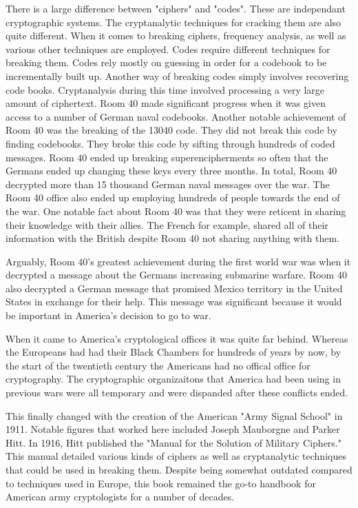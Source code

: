 \documentclass{article}
\begin{document}
    There is a large difference between "ciphers" and "codes". These are independant
    cryptographic systems. The cryptanalytic techniques for cracking them are also
    quite different.
    When it comes to breaking ciphers, frequency analysis, as well as various
    other techniques are employed.
    Codes require different techniques for breaking them. Codes rely mostly
    on guessing in order for a codebook to be incrementally built up.
    Another way of breaking codes simply involves recovering code books.
    Cryptanalysis during this time involved processing a very large amount of
    ciphertext.
    Room 40 made significant progress when it was given access to a number of German
    naval codebooks.
    Another notable achievement of Room 40 was the breaking of the 13040 code.
    They did not break this code by finding codebooks. They broke this code
    by sifting through hundreds of coded messages.
    Room 40 ended up breaking superencipherments so often that the Germans
    ended up changing these keys every three months.
    In total, Room 40 decrypted more than 15 thousand German naval messages
    over the war.
    The Room 40 office also ended up employing hundreds of people towards the
    end of the war.
    One notable fact about Room 40 was that they were reticent in sharing their
    knowledge with their allies. The French for example, shared all of their
    information with the British despite Room 40 not sharing anything with them.

    Arguably, Room 40's greatest achievement during the first world war was when
    it decrypted a message about the Germans increasing submarine warfare.
    Room 40 also decrypted a German message that promised Mexico territory
    in the United States in exchange for their help. This message was significant
    because it would be important in America's decision to go to war.

    When it came to America's cryptological offices it was quite far behind.
    Whereas the Europeans had had their Black Chambers for hundreds of years by now,
    by the start of the twentieth century the Americans had no offical office
    for cryptography. The cryptographic organizaitons that America had been using
    in previous wars were all temporary and were dispanded after these conflicts ended.

    This finally changed with the creation of the American "Army Signal School" in 1911.
    Notable figures that worked here included Joseph Mauborgne and Parker Hitt.
    In 1916, Hitt published the "Manual for the Solution of Military Ciphers."
    This manual detailed various kinds of ciphers as well as cryptanalytic techniques
    that could be used in breaking them. Despite being somewhat outdated compared
    to techniques used in Europe, this book remained the go-to handbook for American
    army cryptologists for a number of decades.
\end{document}
